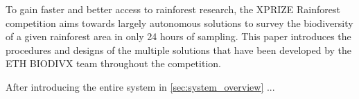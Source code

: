 To gain faster and better access to rainforest research, the XPRIZE Rainforest competition aims towards largely autonomous solutions to survey the biodiversity of a given rainforest area in only 24 hours of sampling.
This paper introduces the procedures and designs of the multiple solutions that have been developed by the ETH BIODIVX team throughout the competition. 

After introducing the entire system in \autoref{sec:system_overview} ...
	
	
	


 
